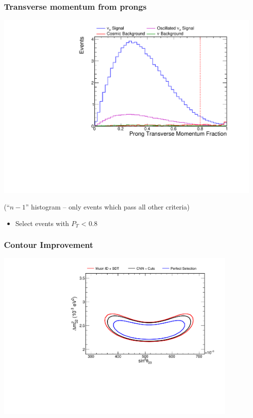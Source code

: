 \documentclass[10pt,professionalfonts,xcolor=table]{beamer}
\begin{document}
\begin{frame}
\frametitle{Transverse momentum from prongs}

  \begin{center}
  \includegraphics[height=0.7\textwidth, angle=-90]{figures/selection/n1_pngptp.pdf}

  {\footnotesize(``$n-1$'' histogram -- only events which pass all other criteria)}
  \end{center}
  \begin{itemize}
  \item Select events with $P_T$ < 0.8
  \end{itemize}
\end{frame}

\begin{frame}
\frametitle{Contour Improvement}
\centering
\includegraphics[angle=-90, width=0.9\textwidth]{figures/selection/contoursfhc1cosmic.pdf}
\end{frame}
\end{document}
